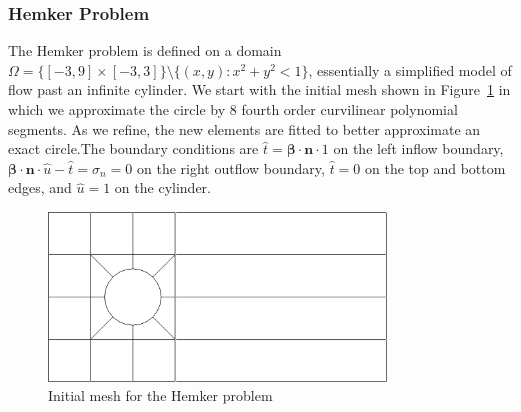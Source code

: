 \documentclass[letterpaper]{article}
\def\bbeta{\boldsymbol\beta}
\begin{document}
\subsubsection{Hemker Problem}
The Hemker problem is defined on a domain
$\Omega=\{[-3,9]\times[-3,3]\}\setminus\{(x,y):x^2+y^2<1\}$, essentially a simplified
model of flow past an infinite cylinder. We start with the initial mesh shown
in Figure~\ref{fig:hemkerInitial} in which we approximate the circle by 8
fourth order curvilinear polynomial segments. As we refine, the new elements are
fitted to better approximate an exact circle.The boundary conditions are $\hat
t=\bbeta\cdot\mathbf{n}\cdot 1$ on the left inflow boundary,
$\bbeta\cdot\mathbf{n}\cdot\hat u-\hat t=\sigma_n=0$ on the right outflow
boundary, $\hat t=0$ on the top and bottom edges, and $\hat u=1$ on the
cylinder.

\begin{figure}[p]
\centering
\includegraphics[width=0.8\textwidth]{figs/Hemker/initial_mesh.png}
\caption{Initial mesh for the Hemker problem}
\label{fig:hemkerInitial}
\end{figure}
\end{document}
